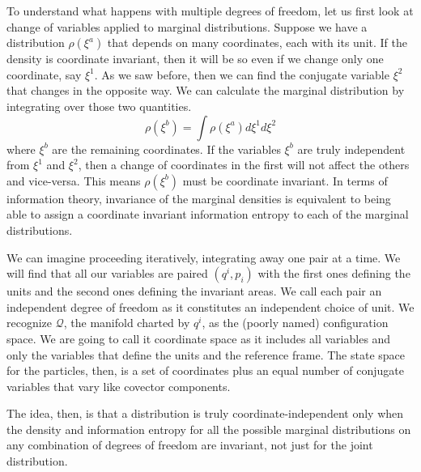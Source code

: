 \documentclass[11pt]{article}
\begin{document}
To understand what happens with multiple degrees of freedom, let us first look at change of variables applied to marginal distributions. Suppose we have a distribution $\rho(\xi^a)$ that depends on many coordinates, each with its unit. If the density is coordinate invariant, then it will be so even if we change only one coordinate, say $\xi^1$. As we saw before, then we can find the conjugate variable $\xi^2$ that changes in the opposite way. We can calculate the marginal distribution by integrating over those two quantities.
\begin{equation}
\rho(\xi^b) = \int \rho(\xi^a) d\xi^1 d\xi^2
\end{equation}
where $\xi^b$ are the remaining coordinates. If the variables $\xi^b$ are truly independent from $\xi^1$ and $\xi^2$, then a change of coordinates in the first will not affect the others and vice-versa. This means $\rho(\xi^b)$ must be coordinate invariant. In terms of information theory, invariance of the marginal densities is equivalent to being able to assign a coordinate invariant information entropy to each of the marginal distributions.

We can imagine proceeding iteratively, integrating away one pair at a time. We will find that all our variables are paired $(q^i, p_i)$  with the first ones defining the units and the second ones defining the invariant areas. We call each pair an independent degree of freedom as it constitutes an independent choice of unit. We recognize $\mathcal{Q}$, the manifold charted by $q^i$, as the (poorly named) configuration space. We are going to call it coordinate space as it includes all variables and only the variables that define the units and the reference frame. The state space for the particles, then, is a set of coordinates plus an equal number of conjugate variables that vary like covector components.

The idea, then, is that a distribution is truly coordinate-independent only when the density and information entropy for all the possible marginal distributions on any combination of degrees of freedom are invariant, not just for the joint distribution.
\end{document}
